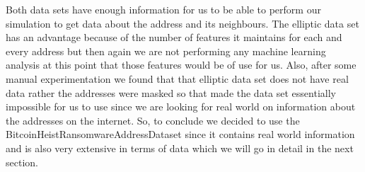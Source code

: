 \documentclass{article}
\begin{document}
        Both data sets have enough information for us to be able to perform our simulation to get data about the address and its neighbours. The elliptic data set has an advantage because of the number of features it maintains for each and every address but then again we are not performing any machine learning analysis at this point that those features would be of use for us. Also, after some manual experimentation we found that that elliptic data set does not have real data rather the addresses were masked so that made the data set essentially impossible for us to use since we are looking for real world on information about the addresses on the internet. So, to conclude we decided to use the BitcoinHeistRansomwareAddressDataset since it contains real world information and is also very extensive in terms of data which we will go in detail in the next section.
        
\pagebreak
    
\end{document}
